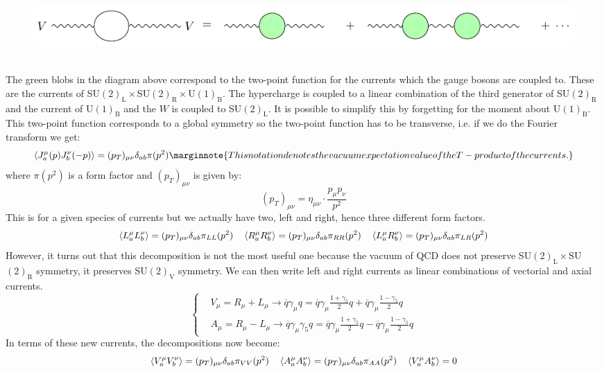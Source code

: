 \documentclass[../main.tex]{subfiles}
\begin{document}
\begin{figure}[h]
    \centering
    \includegraphics[width=1.5\textwidth]{Images/greenblobs.pdf}
    \caption*{}
    \label{greenblobs}
\end{figure}\\
The green blobs in the diagram above correspond to the two-point function for the currents which the gauge bosons are coupled to. These are the currents of SU$(2)_{\text{L}}\times$SU$(2)_{\text{R}}\times$U$(1)_{\text{B}}$. The hypercharge is coupled to a linear combination of the third generator of SU$(2)_{\text{R}}$ and the current of U$(1)_{\text{B}}$ and the $W$ is coupled to SU$(2)_{\text{L}}$. It is possible to simplify this by forgetting for the moment about U$(1)_{\text{B}}$. This two-point function corresponds to a global symmetry so the two-point function has to be transverse, i.e. if we do the Fourier transform we get:
\[
\Braket{J_a^\mu(p)J_b^\nu(-p)}=(p_T)_{\mu\nu}\delta_{ab}\pi(p^2)\marginnote{This notation denotes the vacuum expectation value of the T-product of the currents.}
\]
where $\pi(p^2)$ is a form factor and $(p_T)_{\mu\nu}$ is given by:
\[
(p_T)_{\mu\nu}=\eta_{\mu\nu}\cdot\frac{p_\mu p_\nu}{p^2}
\]
This is for a given species of currents but we actually have two, left and right, hence three different form factors. 
\[
\Braket{L_a^\mu L_b^\nu}=(p_T)_{\mu\nu}\delta_{ab}\pi_{LL}(p^2) \quad \Braket{R_a^\mu R_b^\nu}=(p_T)_{\mu\nu}\delta_{ab}\pi_{RR}(p^2) \quad \Braket{L_a^\mu R_b^\nu}=(p_T)_{\mu\nu}\delta_{ab}\pi_{LR}(p^2)
\]
However, it turns out that this decomposition is not the most useful one because the vacuum of QCD does not preserve SU$(2)_{\text{L}}\times$SU$(2)_{\text{R}}$ symmetry, it preserves SU$(2)_{\text{V}}$ symmetry. We can then write left and right currents as linear combinations of vectorial and axial currents.
\[
\left\{
\begin{aligned}
&V_\mu=R_\mu+L_\mu\to\overline{q}\gamma_\mu q=\overline{q}\gamma_\mu\frac{1+\gamma_5}{2}q+\overline{q}\gamma_\mu\frac{1-\gamma_5}{2}q\\
&A_\mu=R_\mu-L_\mu\to\overline{q}\gamma_\mu\gamma_5q=\overline{q}\gamma_\mu\frac{1+\gamma_5}{2}q-\overline{q}\gamma_\mu\frac{1-\gamma_5}{2}q
\end{aligned}
\right.
\]
In terms of these new currents, the decompositions now become:
\[
\Braket{V_a^\mu V_b^\nu}=(p_T)_{\mu\nu}\delta_{ab}\pi_{VV}(p^2) \quad \Braket{A_a^\mu A_b^\nu}=(p_T)_{\mu\nu}\delta_{ab}\pi_{AA}(p^2) \quad \Braket{V_a^\mu A_b^\nu}=0
\]
\end{document}
